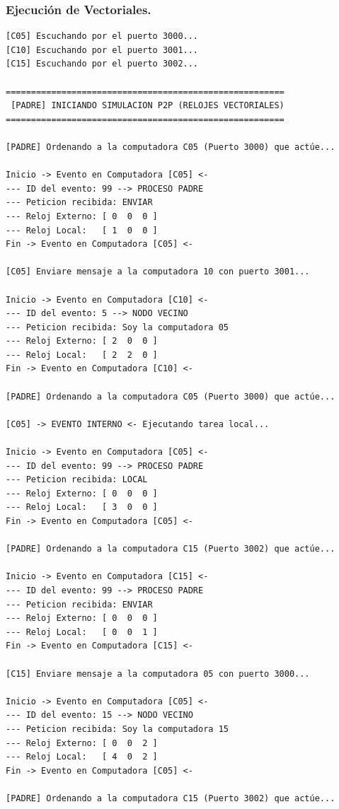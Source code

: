 \subsubsection{Ejecución de Vectoriales.}

\begin{lstlisting}[style=estiloC]
[C05] Escuchando por el puerto 3000...
[C10] Escuchando por el puerto 3001...
[C15] Escuchando por el puerto 3002...

=======================================================
 [PADRE] INICIANDO SIMULACION P2P (RELOJES VECTORIALES)
=======================================================

[PADRE] Ordenando a la computadora C05 (Puerto 3000) que actúe...

Inicio -> Evento en Computadora [C05] <-
--- ID del evento: 99 --> PROCESO PADRE
--- Peticion recibida: ENVIAR
--- Reloj Externo: [ 0  0  0 ]
--- Reloj Local:   [ 1  0  0 ]
Fin -> Evento en Computadora [C05] <-

[C05] Enviare mensaje a la computadora 10 con puerto 3001...

Inicio -> Evento en Computadora [C10] <-
--- ID del evento: 5 --> NODO VECINO
--- Peticion recibida: Soy la computadora 05
--- Reloj Externo: [ 2  0  0 ]
--- Reloj Local:   [ 2  2  0 ]
Fin -> Evento en Computadora [C10] <-

[PADRE] Ordenando a la computadora C05 (Puerto 3000) que actúe...

[C05] -> EVENTO INTERNO <- Ejecutando tarea local...

Inicio -> Evento en Computadora [C05] <-
--- ID del evento: 99 --> PROCESO PADRE
--- Peticion recibida: LOCAL
--- Reloj Externo: [ 0  0  0 ]
--- Reloj Local:   [ 3  0  0 ]
Fin -> Evento en Computadora [C05] <-

[PADRE] Ordenando a la computadora C15 (Puerto 3002) que actúe...

Inicio -> Evento en Computadora [C15] <-
--- ID del evento: 99 --> PROCESO PADRE
--- Peticion recibida: ENVIAR
--- Reloj Externo: [ 0  0  0 ]
--- Reloj Local:   [ 0  0  1 ]
Fin -> Evento en Computadora [C15] <-

[C15] Enviare mensaje a la computadora 05 con puerto 3000...

Inicio -> Evento en Computadora [C05] <-
--- ID del evento: 15 --> NODO VECINO
--- Peticion recibida: Soy la computadora 15
--- Reloj Externo: [ 0  0  2 ]
--- Reloj Local:   [ 4  0  2 ]
Fin -> Evento en Computadora [C05] <-

[PADRE] Ordenando a la computadora C15 (Puerto 3002) que actúe...


\end{lstlisting}
